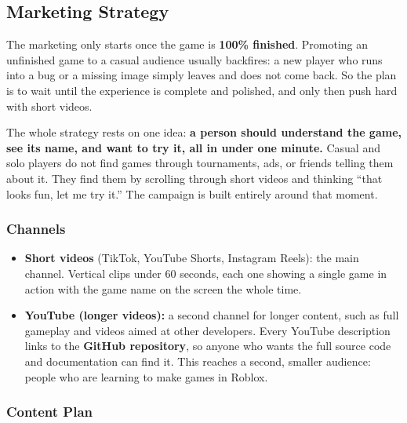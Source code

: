 \documentclass[12pt,letterpaper]{article}
\begin{document}
\subsection{Marketing Strategy}

The marketing only starts once the game is \textbf{100\% finished}. Promoting an unfinished game to a casual audience usually backfires: a new player who runs into a bug or a missing image simply leaves and does not come back. So the plan is to wait until the experience is complete and polished, and only then push hard with short videos.

The whole strategy rests on one idea: \textbf{a person should understand the game, see its name, and want to try it, all in under one minute.} Casual and solo players do not find games through tournaments, ads, or friends telling them about it. They find them by scrolling through short videos and thinking ``that looks fun, let me try it.'' The campaign is built entirely around that moment.

\subsubsection{Channels}

\begin{itemize}
  \item \textbf{Short videos} (TikTok, YouTube Shorts, Instagram Reels): the main channel. Vertical clips under 60 seconds, each one showing a single game in action with the game name on the screen the whole time.
  \item \textbf{YouTube (longer videos):} a second channel for longer content, such as full gameplay and videos aimed at other developers. Every YouTube description links to the \textbf{GitHub repository}, so anyone who wants the full source code and documentation can find it. This reaches a second, smaller audience: people who are learning to make games in Roblox.
\end{itemize}

\subsubsection{Content Plan}
\end{document}
